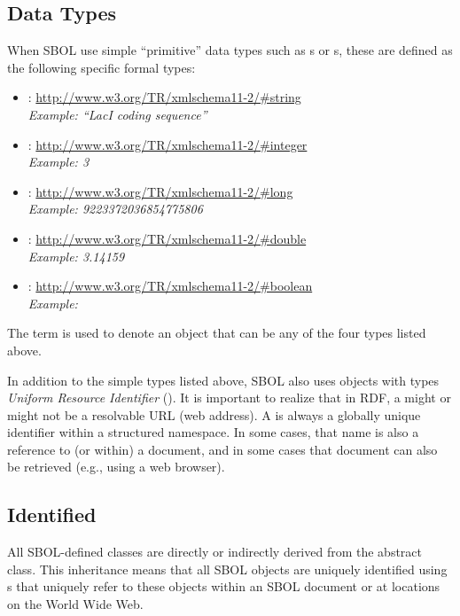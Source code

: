 \subsection{Data Types}
\label{sec:datatypes}
\label{sec:String}
\label{sec:Integer}
\label{sec:Long}
\label{sec:Double}
\label{sec:Boolean}
\label{sec:URI}
\label{sec:literal}

When SBOL use simple ``primitive'' data types such as s or s, these are defined as the following specific formal types:
\begin{itemize}
\item {}: \url{http://www.w3.org/TR/xmlschema11-2/#string}\\
  {\em Example: ``LacI coding sequence''}
\item {}: \url{http://www.w3.org/TR/xmlschema11-2/#integer}\\
  {\em Example: 3}
\item {}: \url{http://www.w3.org/TR/xmlschema11-2/#long}\\
  {\em Example: 9223372036854775806}
\item {}: \url{http://www.w3.org/TR/xmlschema11-2/#double}\\
  {\em Example: 3.14159}
\item {}: \url{http://www.w3.org/TR/xmlschema11-2/#boolean}\\
  {\em Example: }
\end{itemize}
The term  is used to denote an object that can be any of the four types listed above.

In addition to the simple types listed above, SBOL also uses objects with types \emph{Uniform Resource Identifier} (). It is important to realize that in RDF, a  might or might not be a resolvable URL (web address).  A  is always a globally unique identifier within a structured namespace.  In some cases, that name is also a reference to (or within) a document, and in some cases that document can also be retrieved (e.g., using a web browser).

\subsection{Identified}
\label{sec:Identified}

All SBOL-defined classes are directly or indirectly derived from the   abstract class.
This inheritance means that all SBOL objects are uniquely identified using s that uniquely refer to these objects within an SBOL document or at locations on the World Wide Web.

